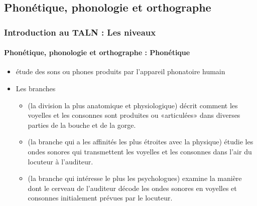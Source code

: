 \documentclass[xcolor=table]{beamer}
\begin{document}
\subsection{Phonétique, phonologie et orthographe}

\begin{frame}
\frametitle{Introduction au TALN : Les niveaux}
\framesubtitle{Phonétique, phonologie et orthographe : Phonétique}

\begin{itemize}
	\item étude des sons ou phones produits par l'appareil phonatoire humain
	\item Les branches
	\begin{itemize}
		\item {} (la division la plus anatomique et physiologique) décrit comment les voyelles et les consonnes sont produites ou «articulées» dans diverses parties de la bouche et de la gorge.
		\item {} (la branche qui a les affinités les plus étroites avec la physique) étudie les ondes sonores qui transmettent les voyelles et les consonnes dans l'air du locuteur à l'auditeur.
		\item {} (la branche qui intéresse le plus les psychologues) examine la manière dont le cerveau de l'auditeur décode les ondes sonores en voyelles et consonnes initialement prévues par le locuteur.
	\end{itemize}
\end{itemize}

\end{frame}
\end{document}
